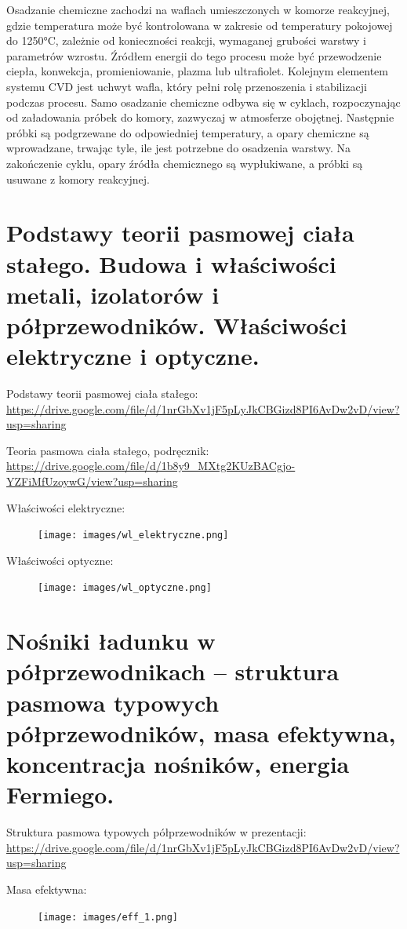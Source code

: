 \documentclass{article}
\begin{document}
\noindent Osadzanie chemiczne zachodzi na waflach umieszczonych w komorze reakcyjnej, gdzie temperatura może być kontrolowana w zakresie od temperatury pokojowej do 1250°C, zależnie od konieczności reakcji, wymaganej grubości warstwy i parametrów wzrostu. Źródłem energii do tego procesu może być przewodzenie ciepła, konwekcja, promieniowanie, plazma lub ultrafiolet. Kolejnym elementem systemu CVD jest uchwyt wafla, który pełni rolę przenoszenia i stabilizacji podczas procesu.
Samo osadzanie chemiczne odbywa się w cyklach, rozpoczynając od załadowania próbek do komory, zazwyczaj w atmosferze obojętnej. Następnie próbki są podgrzewane do odpowiedniej temperatury, a opary chemiczne są wprowadzane, trwając tyle, ile jest potrzebne do osadzenia warstwy. Na zakończenie cyklu, opary źródła chemicznego są wypłukiwane, a próbki są usuwane z komory reakcyjnej.  


\section{Podstawy teorii pasmowej ciała stałego. Budowa i właściwości metali, izolatorów i półprzewodników. Właściwości elektryczne i optyczne.}

Podstawy teorii pasmowej ciała stałego: \url{https://drive.google.com/file/d/1nrGbXv1jF5pLyJkCBGizd8PI6AvDw2vD/view?usp=sharing}

Teoria pasmowa ciała stałego, podręcznik: \url{https://drive.google.com/file/d/1b8y9_MXtg2KUzBACgjo-YZFiMfUzoywG/view?usp=sharing}

Właściwości elektryczne:
\begin{figure}[H]
    \centering
    \texttt{[image: images/wl\_elektryczne.png]}
\end{figure}

Właściwości optyczne:
\begin{figure}[H]
    \centering
    \texttt{[image: images/wl\_optyczne.png]}
\end{figure}

\section{Nośniki ładunku w półprzewodnikach -- struktura pasmowa typowych półprzewodników, masa efektywna, koncentracja nośników, energia Fermiego.}
Struktura pasmowa typowych półprzewodników w prezentacji: \url{https://drive.google.com/file/d/1nrGbXv1jF5pLyJkCBGizd8PI6AvDw2vD/view?usp=sharing}

Masa efektywna:
\begin{figure}[H]
    \centering
    \texttt{[image: images/eff\_1.png]}
\end{figure}
\end{document}
